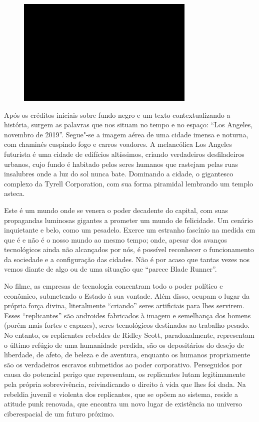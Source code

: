 \begin{figure}[!ht]
\centering
 \includegraphics[width=85mm]{./imgs/im1.jpg}
\caption{\tiny{}}
\end{figure}

Após os créditos iniciais sobre fundo negro e um texto contextualizando
a história, surgem as palavras que nos situam no tempo e no espaço:
``Los Angeles, novembro de 2019''. Segue"-se a imagem aérea de uma cidade
imensa e noturna, com chaminés cuspindo fogo e carros voadores. A melancólica Los Angeles futurista é uma cidade de
edifícios altíssimos, criando verdadeiros desfiladeiros urbanos, cujo
fundo é habitado pelos seres humanos que rastejam pelas ruas insalubres
onde a luz do sol nunca bate. Dominando a cidade, o gigantesco complexo da
Tyrell Corporation, com sua forma piramidal lembrando um templo asteca.

Este é um mundo onde se venera o poder decadente do capital, com suas
propagandas luminosas gigantes a prometer um mundo de felicidade. Um
cenário inquietante e belo, como um pesadelo. Exerce um estranho
fascínio na medida em que é e não é o nosso mundo ao mesmo tempo; onde,
apesar dos avanços tecnológicos ainda não alcançados por nós, é possível
reconhecer o funcionamento da sociedade e a configuração das cidades.
Não é por acaso que tantas vezes nos vemos diante de algo ou de uma
situação que ``parece Blade Runner''.

No filme, as empresas de tecnologia concentram todo o poder político e \label{replicantes}
econômico, submetendo o Estado à sua vontade. Além disso, ocupam o lugar
da própria força divina, literalmente ``criando'' seres artificiais para
lhes servirem. Esses ``replicantes'' são androides fabricados à imagem e
semelhança dos homens (porém mais fortes e capazes), seres
tecnológicos destinados ao trabalho pesado. No entanto, os replicantes rebeldes
de Ridley Scott, paradoxalmente, representam o último refúgio de uma
humanidade perdida, são os depositários do desejo de liberdade, de
afeto, de beleza e de aventura, enquanto os humanos propriamente são os
verdadeiros escravos submetidos ao poder corporativo. Perseguidos por
causa do potencial perigo que representam, os replicantes lutam legitimamente pela
própria sobrevivência, reivindicando o direito à vida que lhes foi dada.
Na rebeldia juvenil e violenta dos replicantes, que se opõem ao sistema, reside a atitude punk renovada, que encontra um novo lugar de existência no
universo ciberespacial de um futuro próximo.

